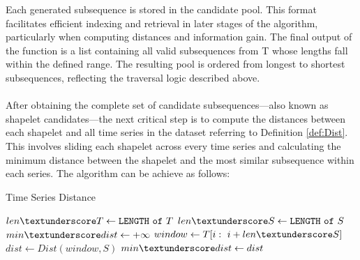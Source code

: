 Each generated subsequence is stored in the candidate pool. This format facilitates efficient indexing and retrieval in later stages of the algorithm, particularly when computing distances and information gain. The final output of the function is a list containing all valid subsequences from T whose lengths fall within the defined range. The resulting pool is ordered from longest to shortest subsequences, reflecting the traversal logic described above.\\
\\
After obtaining the complete set of candidate subsequences—also known as shapelet candidates—the next critical step is to compute the distances between each shapelet and all time series in the dataset referring to Definition \ref{def:Dist}. This involves sliding each shapelet across every time series and calculating the minimum distance between the shapelet and the most similar subsequence within each series. The algorithm can be achieve as follows:\\
\begin{algorithm}[H]
	\caption{Time Series Distance}
	\begin{algorithmic}[1]{
			\State $len \textunderscore T \gets \mathtt{LENGTH\ of}\ T$
			\State $len \textunderscore S \gets \mathtt{LENGTH\ of}\ S$
			\State $min \textunderscore dist \gets +\infty$
			\State $window \gets T[i:\ i + len \textunderscore S]$
			\State $dist \gets Dist(window,S)$ 
			\State $min \textunderscore dist \gets dist$ 
			\EndIf
			\EndFor
			\EndProcedure
		}
	\end{algorithmic}
	\label{al:DIST}
\end{algorithm}

